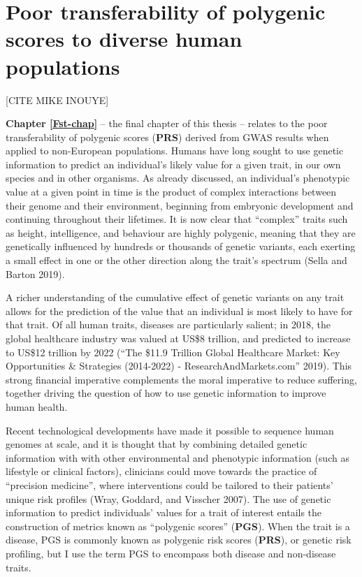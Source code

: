 \documentclass[
]{book}
\begin{document}
\hypertarget{poor-transferability-of-polygenic-scores-to-diverse-human-populations}{%
\section{Poor transferability of polygenic scores to diverse human populations}\label{poor-transferability-of-polygenic-scores-to-diverse-human-populations}}

{[}CITE MIKE INOUYE{]}

\textbf{Chapter \ref{Fst-chap}} -- the final chapter of this thesis -- relates to the poor transferability of polygenic scores (\textbf{PRS}) derived from GWAS results when applied to non-European populations. Humans have long sought to use genetic information to predict an individual's likely value for a given trait, in our own species and in other organisms. As already discussed, an individual's phenotypic value at a given point in time is the product of complex interactions between their genome and their environment, beginning from embryonic development and continuing throughout their lifetimes. It is now clear that ``complex'' traits such as height, intelligence, and behaviour are highly polygenic, meaning that they are genetically influenced by hundreds or thousands of genetic variants, each exerting a small effect in one or the other direction along the trait's spectrum (Sella and Barton 2019).

A richer understanding of the cumulative effect of genetic variants on any trait allows for the prediction of the value that an individual is most likely to have for that trait. Of all human traits, diseases are particularly salient; in 2018, the global healthcare industry was valued at US\$8 trillion, and predicted to increase to US\$12 trillion by 2022 ({``The \$11.9 {Trillion Global Healthcare Market}: {Key Opportunities} \& {Strategies} (2014-2022) - {ResearchAndMarkets}.com''} 2019). This strong financial imperative complements the moral imperative to reduce suffering, together driving the question of how to use genetic information to improve human health.

Recent technological developments have made it possible to sequence human genomes at scale, and it is thought that by combining detailed genetic information with with other environmental and phenotypic information (such as lifestyle or clinical factors), clinicians could move towards the practice of ``precision medicine'', where interventions could be tailored to their patients' unique risk profiles (Wray, Goddard, and Visscher 2007). The use of genetic information to predict individuals' values for a trait of interest entails the construction of metrics known as ``polygenic scores'' (\textbf{PGS}). When the trait is a disease, PGS is commonly known as polygenic risk scores (\textbf{PRS}), or genetic risk profiling, but I use the term PGS to encompass both disease and non-disease traits.
\end{document}
